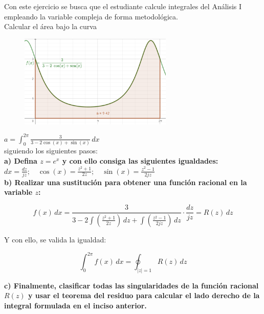 \documentclass[12pt]{report}
\begin{document}
    Con este ejercicio se busca que el estudiante calcule integrales del Análisis I empleando la variable compleja de forma metodológica.\\

Calcular el área bajo la curva\\


\begin{figure}[h] %
    \centering %
    \includegraphics[width=0.65\textwidth]{./Imagenes/foto1Ej7.png} %
\end{figure}

$a = \int_{0}^{2\pi} \frac{3}{3 - 2\cos(x) + \sin(x)} \, dx$\\[6pt]

siguiendo los siguientes pasos:\\[6pt]

\textbf{a)  Defina $z = e^{x}$ y con ello consiga las siguientes igualdades:}\\[6pt]

$dx = \frac{dz}{jz}; \quad \cos(x) = \frac{z^{2} + 1}{2z}; \quad \sin(x) = \frac{z^{2} - 1}{2jz}$\\[6pt]

\textbf{b)  Realizar una sustitución para obtener una función racional en la variable \( z \):}

$$ f(x) \, dx = \frac{3}{3 - 2\int \left( \frac{z^{2} + 1}{2z} \right) \, dz + \int \left( \frac{z^{2} - 1}{2jz} \right) \, dz} \cdot \frac{dz}{jz} = R(z) \, dz $$ 

Y con ello, se valida la igualdad:

$$ \int_{0}^{2\pi} f(x) \, dx = \oint_{|z|=1} R(z) \, dz$$ 


\textbf{c)  Finalmente, clasificar todas las singularidades de la función racional $R(z)$ y usar el teorema del residuo para calcular el lado derecho de la integral formulada en el inciso anterior.}
\end{document}
